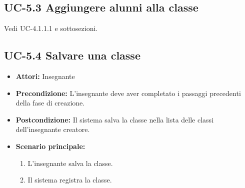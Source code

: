 \subsection{UC-5.3 Aggiungere alunni alla classe}
Vedi UC-4.1.1.1 e sottosezioni.
\subsection{UC-5.4 Salvare una classe}
\begin{itemize}
	\item \textbf{Attori:} Insegnante
	\item \textbf{Precondizione:} L'insegnante deve aver completato i passaggi precedenti della fase di creazione.
	\item \textbf{Postcondizione:} Il sistema salva la classe nella lista delle classi dell'insegnante creatore.
	\item \textbf{Scenario principale:} 
	\begin{enumerate}
			\item L'insegnante salva la classe. 
			\item Il sistema registra la classe.
		\end{enumerate} 
\end{itemize}
